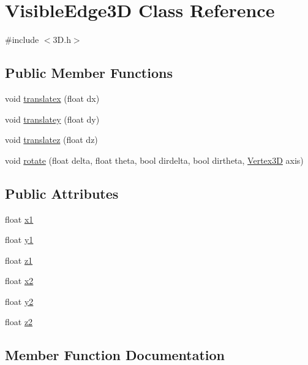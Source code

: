 \hypertarget{class_visible_edge3_d}{}\section{Visible\+Edge3D Class Reference}
\label{class_visible_edge3_d}


{\ttfamily \#include $<$3\+D.\+h$>$}

\subsection*{Public Member Functions}
\begin{DoxyCompactItemize}
\item 
void \hyperlink{class_visible_edge3_d_a81ab9194da1a4783822791c724e8a63c}{translatex} (float dx)
\item 
void \hyperlink{class_visible_edge3_d_a48f6254fb4e247392cd261a7f937fc63}{translatey} (float dy)
\item 
void \hyperlink{class_visible_edge3_d_a0948f7df911eba185a8a95caeb468c0d}{translatez} (float dz)
\item 
void \hyperlink{class_visible_edge3_d_a264bd0e3184db14052509d8f19d8b6f8}{rotate} (float delta, float theta, bool dirdelta, bool dirtheta, \hyperlink{class_vertex3_d}{Vertex3D} axis)
\end{DoxyCompactItemize}
\subsection*{Public Attributes}
\begin{DoxyCompactItemize}
\item 
float \hyperlink{class_visible_edge3_d_a241363ce7265575a9119b8f217ec3b11}{x1}
\item 
float \hyperlink{class_visible_edge3_d_a97ccd88f6e8c8f92829940dec525bab6}{y1}
\item 
float \hyperlink{class_visible_edge3_d_ad080d0b1f9c8327bb691f421b8f04e3f}{z1}
\item 
float \hyperlink{class_visible_edge3_d_a75364dcc798d833dd3ade53ddf734055}{x2}
\item 
float \hyperlink{class_visible_edge3_d_a58da80f0733956ed974580a414b84e06}{y2}
\item 
float \hyperlink{class_visible_edge3_d_a90b18a97ee484e34b2dc18cadb2366f7}{z2}
\end{DoxyCompactItemize}


\subsection{Member Function Documentation}
